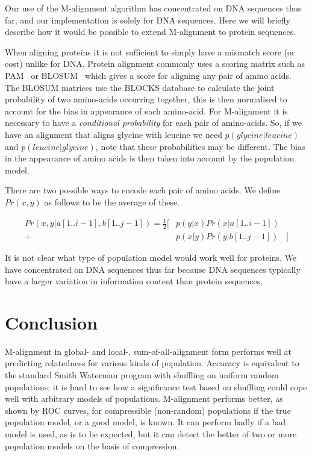 \documentclass[letterpaper,11pt,oneside]{article}
\begin{document}
\begin{multicols}{2}
Our use of the M-alignment algorithm has concentrated on DNA sequences thus
far, and our implementation is solely for DNA sequences.  Here we will briefly
describe how it would be possible to extend M-alignment to protein sequences.

When aligning proteins it is not sufficient to simply have a mismatch score
(or cost) unlike for DNA.  Protein alignment commonly uses a scoring matrix
such as PAM~\cite{dayhoff78} or BLOSUM~\cite{henikoff92} which gives a score
for aligning any pair of amino acids.  The BLOSUM matrices use the BLOCKS
database to calculate the joint probability of two amino-acids occurring
together, this is then normalised to account for the bias in appearance of
each amino-acid.  For M-alignment it is necessary to have a {\em conditional
probability} for each pair of amino-acids.  So, if we have an alignment that
aligns glycine with leucine we need $p(glycine | leucine)$ and $p(leucine |
glycine)$, note that these probabilities may be different.  The bias in the
appearance of amino acids is then taken into account by the population model.

There are two possible ways to encode each pair of amino acids.  We define
$Pr(x,y)$ as follows to be the average of these.

{
\small
\setlength{\arraycolsep}{0pt}
\begin{eqnarray*}
Pr(x,y | a[1..i-1],b[1..j-1] ) = \frac{1}{2}
[ & p(y|x) Pr(x | a[1..i-1]) & \\
+ & p(x|y) Pr(y | b[1..j-1]) & ]
\end{eqnarray*}
}

It is not clear what type of population model would work well for proteins.
We have concentrated on DNA sequences thus far because DNA sequences typically
have a larger variation in information content than protein sequences.

\section{Conclusion} \label{sec:conc}

M-alignment in global- and local-, sum-of-all-alignment form performs well
at predicting relatedness for various kinds of population.
Accuracy is equivalent to the standard Smith Waterman program with shuffling
on uniform random populations;
it is hard to see how a significance test based on shuffling could
cope well with arbitrary models of populations.
M-alignment performs better, as shown by ROC curves,
for compressible (non-random) populations if the true
population model, or a good model, is known.
It can perform badly if a bad model is used, as is to be expected,
but it can detect the better of two or more population models
on the basis of compression.


\end{multicols}
\end{document}
